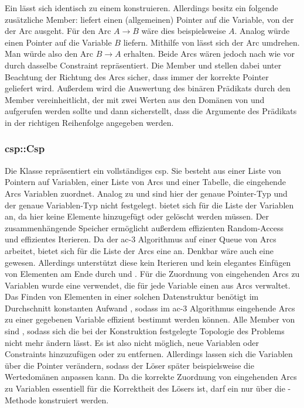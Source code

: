 Ein  lässt sich identisch zu einem  konstruieren. Allerdings besitz ein  folgende zusätzliche Member: 
liefert einen (allgemeinen) Pointer auf die Variable, von der der Arc ausgeht. Für den Arc $A \rightarrow B$ wäre dies beispielsweise $A$. Analog würde  einen Pointer
auf die Variable $B$ liefern. Mithilfe von  lässt sich der Arc umdrehen. Man würde also den Arc $B \rightarrow A$ erhalten. Beide Arcs wären jedoch nach wie vor
durch dasselbe Constraint repräsentiert. Die Member  und  stellen dabei unter Beachtung der Richtung des Arcs sicher, dass immer der korrekte Pointer
geliefert wird. Außerdem wird die Auswertung des binären Prädikats durch den Member  vereinheitlicht, der mit zwei Werten aus den Domänen von
 und  aufgerufen werden sollte und dann sicherstellt, dass die Argumente des Prädikats in der richtigen Reihenfolge angegeben werden.

\subsubsection{csp::Csp}
Die Klasse  repräsentiert ein vollständiges \ac*{csp}. Sie besteht aus einer Liste von Pointern auf Variablen, einer Liste von Arcs und einer Tabelle, die
eingehende Arcs Variablen zuordnet. Analog zu  und  sind hier der genaue Pointer-Typ und der genaue Variablen-Typ nicht festgelegt.
 bietet sich für die Liste der Variablen an, da hier keine Elemente hinzugefügt oder gelöscht werden müssen. Der zusammenhängende Speicher ermöglicht außerdem
effizienten Random-Access und effizientes Iterieren. Da der \ac*{ac}-3 Algorithmus auf einer Queue von Arcs arbeitet, bietet sich für die Liste der Arcs eine 
an. Denkbar wäre auch eine  gewesen. Allerdings unterstützt diese kein Iterieren und kein elegantes Einfügen von Elementen am Ende durch
 und . Für die Zuordnung von eingehenden Arcs zu Variablen wurde eine  verwendet, die für jede Variable
einen  aus Arcs verwaltet. Das Finden von Elementen in einer solchen Datenstruktur benötigt im Durchschnitt konstanten Aufwand \cite{uMap}, sodass im \ac*{ac}-3
Algorithmus eingehende Arcs zu einer gegebenen Variable effizient bestimmt werden können. Alle Member von  sind , sodass sich die bei der
Konstruktion festgelegte Topologie des Problems nicht mehr ändern lässt. Es ist also nicht möglich, neue Variablen oder Constraints hinzuzufügen oder zu entfernen. Allerdings
lassen sich die Variablen über die Pointer verändern, sodass der Löser später beispielsweise die Wertedomänen anpassen kann. Da die korrekte Zuordnung von eingehenden Arcs zu
Variablen essentiell für die Korrektheit des Lösers ist, darf ein  nur über die -Methode  konstruiert werden.

